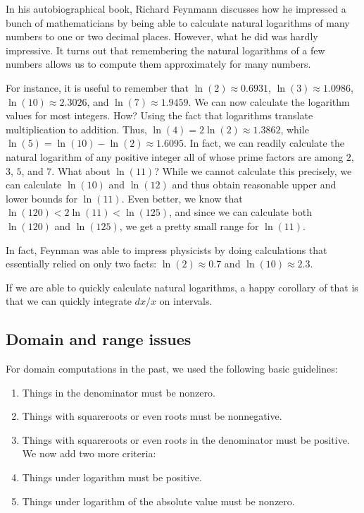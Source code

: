 \documentclass[10pt]{amsart}
\begin{document}
In his autobiographical book, Richard Feynmann discusses how he
impressed a bunch of mathematicians by being able to calculate natural
logarithms of many numbers to one or two decimal places. However, what
he did was hardly impressive. It turns out that remembering the
natural logarithms of a few numbers allows us to compute them
approximately for many numbers.

For instance, it is useful to remember that $\ln(2) \approx 0.6931$,
$\ln(3) \approx 1.0986$, $\ln(10) \approx 2.3026$, and $\ln(7) \approx
1.9459$. We can now calculate the logarithm values for most
integers. How? Using the fact that logarithms translate multiplication
to addition. Thus, $\ln(4) = 2\ln(2) \approx 1.3862$, while $\ln(5) =
\ln(10) - \ln(2) \approx 1.6095$. In fact, we can readily calculate
the natural logarithm of any positive integer all of whose prime
factors are among $2$, $3$, $5$, and $7$. What about $\ln(11)$? While
we cannot calculate this precisely, we can calculate $\ln(10)$
and $\ln(12)$ and thus obtain reasonable upper and lower bounds for
$\ln(11)$. Even better, we know that $\ln(120) < 2 \ln(11) <
\ln(125)$, and since we can calculate both $\ln(120)$ and $\ln(125)$,
we get a pretty small range for $\ln(11)$.

In fact, Feynman was able to impress physicists by doing calculations
that essentially relied on only two facts: $\ln(2) \approx 0.7$ and
$\ln(10) \approx 2.3$.

If we are able to quickly calculate natural logarithms, a happy
corollary of that is that we can quickly integrate $dx/x$ on intervals.

\subsection{Domain and range issues}

For domain computations in the past, we used the following basic
guidelines:

\begin{enumerate}
\item Things in the denominator must be nonzero.
\item Things with squareroots or even roots must be nonnegative.
\item Things with squareroots or even roots in the denominator must be
positive.\\
\vspace{0.2in}
We now add two more criteria:
\vspace{0.2in}
\item Things under logarithm must be positive.
\item Things under logarithm of the absolute value must be nonzero.
\end{enumerate}
\end{document}
